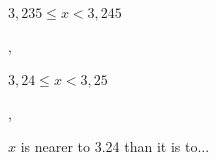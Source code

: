 \documentclass[a4paper,10 pt]{article}
\begin{document}
  
\begin{alterqcm}[symb = \dingsquare, lq=6cm]
{{\begin{minipage}[t]{\linewidth-1cm}$3,235\leqslant x <3,245$\\
  \end{minipage}} ,
 {\begin{minipage}[t]{\linewidth-1cm} $3,24\leqslant x <3,25$\\
  \end{minipage}} ,
 {\begin{minipage}[t]{\linewidth-1cm}
     $x$ is nearer to 3.24 than it is to... 
  \end{minipage}}}
\end{alterqcm}
\end{document}
